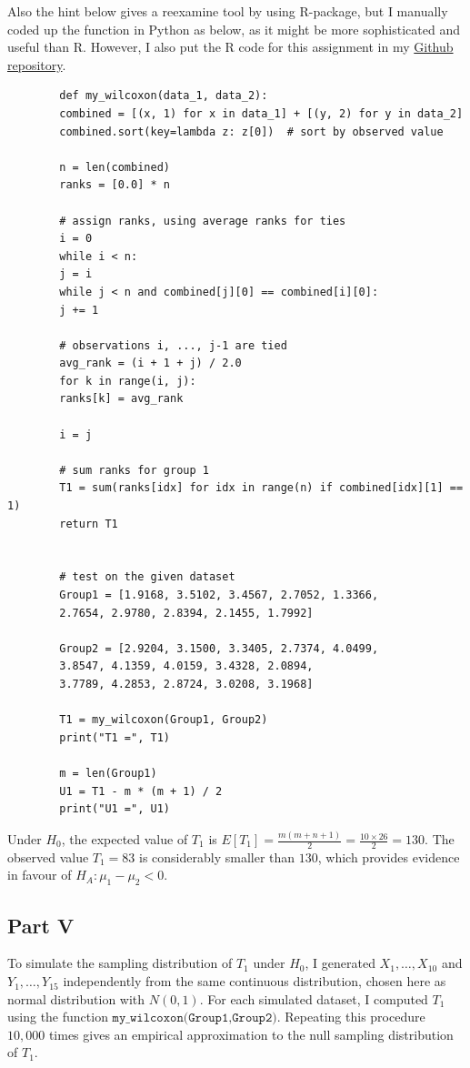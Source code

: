 \documentclass[letterpaper]{article}
\begin{document}
	Also the hint below gives a reexamine tool by using R-package, but I manually coded up the function in Python as below, as it might be more sophisticated and useful than R. However, I also put the R code for this assignment in my \href{https://github.com/zongyiliu/STAT_5291/tree/main/Homework/Homework_2}{Github repository}.
	\begin{lstlisting}
		def my_wilcoxon(data_1, data_2):
		combined = [(x, 1) for x in data_1] + [(y, 2) for y in data_2]
		combined.sort(key=lambda z: z[0])  # sort by observed value
		
		n = len(combined)
		ranks = [0.0] * n
		
		# assign ranks, using average ranks for ties
		i = 0
		while i < n:
		j = i
		while j < n and combined[j][0] == combined[i][0]:
		j += 1
		
		# observations i, ..., j-1 are tied
		avg_rank = (i + 1 + j) / 2.0
		for k in range(i, j):
		ranks[k] = avg_rank
		
		i = j
		
		# sum ranks for group 1
		T1 = sum(ranks[idx] for idx in range(n) if combined[idx][1] == 1)
		return T1
		
		
		# test on the given dataset
		Group1 = [1.9168, 3.5102, 3.4567, 2.7052, 1.3366,
		2.7654, 2.9780, 2.8394, 2.1455, 1.7992]
		
		Group2 = [2.9204, 3.1500, 3.3405, 2.7374, 4.0499,
		3.8547, 4.1359, 4.0159, 3.4328, 2.0894,
		3.7789, 4.2853, 2.8724, 3.0208, 3.1968]
		
		T1 = my_wilcoxon(Group1, Group2)
		print("T1 =", T1)
		
		m = len(Group1)
		U1 = T1 - m * (m + 1) / 2
		print("U1 =", U1)
	\end{lstlisting}
	
	Under $H_0$, the expected value of $T_1$ is
	$E[T_1] = \frac{m(m+n+1)}{2} = \frac{10\times 26}{2} = 130.$ The observed value $T_1=83$ is considerably smaller than $130$, which provides evidence in favour of $H_A: \mu_1-\mu_2 < 0$.
	\clearpage
	
	\subsection{Part V}
	
	To simulate the sampling distribution of $T_1$ under $H_0$, I generated
	$X_1,\dots,X_{10}$ and $Y_1,\dots,Y_{15}$ independently from the same continuous
	distribution, chosen here as normal distribution with $N(0,1)$. For each simulated dataset, I computed
	$T_1$ using the function $\texttt{my\_wilcoxon(Group1,Group2)}$. Repeating this
	procedure $10{,}000$ times gives an empirical approximation to the null sampling
	distribution of $T_1$.
	
\end{document}
